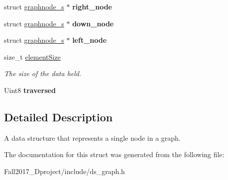 \begin{DoxyCompactItemize}
struct \hyperlink{structgraphnode__s}{graphnode\+\_\+s} $\ast$ {\bfseries right\+\_\+node}
\item 
\mbox{\label{structgraphnode__s_acf49746ce8b7499670a57ae6a13703aa}} 
struct \hyperlink{structgraphnode__s}{graphnode\+\_\+s} $\ast$ {\bfseries down\+\_\+node}
\item 
\mbox{\label{structgraphnode__s_a3f5d8b5310c2a75d945eb7576e3dc558}} 
struct \hyperlink{structgraphnode__s}{graphnode\+\_\+s} $\ast$ {\bfseries left\+\_\+node}
\item 
\mbox{\label{structgraphnode__s_a61c1eca5b2f01044e82b4344aae39580}} 
size\+\_\+t \hyperlink{structgraphnode__s_a61c1eca5b2f01044e82b4344aae39580}{element\+Size}
\begin{DoxyCompactList}\small\item\em The size of the data held. \end{DoxyCompactList}\item 
\mbox{\label{structgraphnode__s_aab37a824f4d8a1880e1bd37e6b930f22}} 
Uint8 {\bfseries traversed}
\end{DoxyCompactItemize}


\subsection{Detailed Description}
A data structure that represents a single node in a graph. 

The documentation for this struct was generated from the following file\+:\begin{DoxyCompactItemize}
\item 
Fall2017\+\_\+Dproject/include/ds\+\_\+graph.\+h\end{DoxyCompactItemize}
